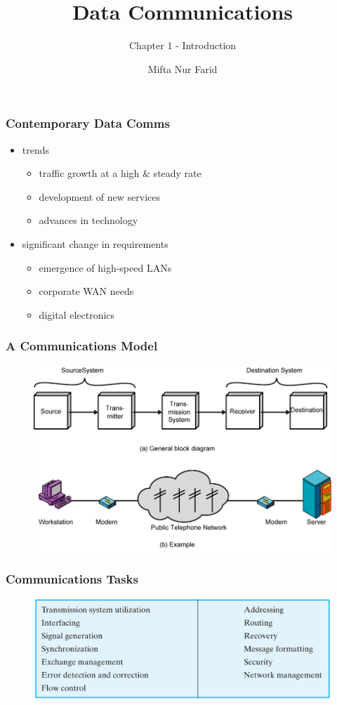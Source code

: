 \documentclass[pdflatex,compress]{beamer}
\title{Data Communications}
\subtitle{Chapter 1 - Introduction}
\author{Mifta Nur Farid}
\begin{document}
\maketitle

\begin{frame}
	\frametitle{Contemporary Data Comms}
	\begin{itemize}
		\item trends
		\begin{itemize}
			\item traffic growth at a high \& steady rate
			\item development of new services
			\item advances in technology
		\end{itemize}
		\item significant change in requirements
		\begin{itemize}
			\item emergence of high-speed LANs
			\item corporate WAN needs
			\item digital electronics
		\end{itemize}
	\end{itemize}
\end{frame}

\begin{frame}
	\frametitle{A Communications Model}
	\begin{figure}
		\centering
		\includegraphics[width=\linewidth]{img/img01}
		\label{fig:img01}
	\end{figure}
\end{frame}

\begin{frame}
	\frametitle{Communications Tasks}
	\begin{figure}
		\centering
		\includegraphics[width=\linewidth]{img/img02}
		\label{fig:img02}
	\end{figure}
\end{frame}
\end{document}
